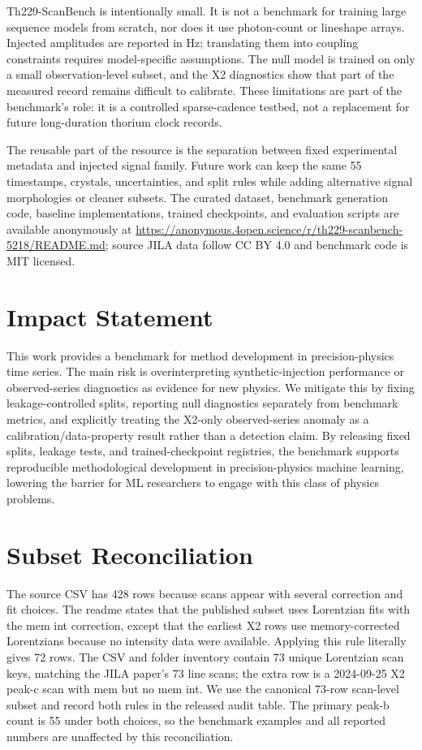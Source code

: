 \documentclass{article}
\newcommand{\thscan}{Th229-ScanBench}
\newcommand{\anonrepo}{\url{https://anonymous.4open.science/r/th229-scanbench-5218/README.md}}
\begin{document}
\thscan{} is intentionally small.  It is not a benchmark for training large sequence models from scratch, nor does it use photon-count or lineshape arrays.  Injected amplitudes are reported in Hz; translating them into coupling constraints requires model-specific assumptions.  The null model is trained on only a small observation-level subset, and the X2 diagnostics show that part of the measured record remains difficult to calibrate.  These limitations are part of the benchmark's role: it is a controlled sparse-cadence testbed, not a replacement for future long-duration thorium clock records.

The reusable part of the resource is the separation between fixed experimental metadata and injected signal family.  Future work can keep the same 55 timestamps, crystals, uncertainties, and split rules while adding alternative signal morphologies or cleaner subsets.  The curated dataset, benchmark generation code, baseline implementations, trained checkpoints, and evaluation scripts are available anonymously at \anonrepo{}; source JILA data follow CC BY 4.0 and benchmark code is MIT licensed.

\section*{Impact Statement}

This work provides a benchmark for method development in precision-physics time series.  The main risk is overinterpreting synthetic-injection performance or observed-series diagnostics as evidence for new physics.  We mitigate this by fixing leakage-controlled splits, reporting null diagnostics separately from benchmark metrics, and explicitly treating the X2-only observed-series anomaly as a calibration/data-property result rather than a detection claim.  By releasing fixed splits, leakage tests, and trained-checkpoint registries, the benchmark supports reproducible methodological development in precision-physics machine learning, lowering the barrier for ML researchers to engage with this class of physics problems.




\appendix

\section{Subset Reconciliation}\label{app:subset}

The source CSV has 428 rows because scans appear with several correction and fit choices.  The readme states that the published subset uses Lorentzian fits with the mem int correction, except that the earliest X2 rows use memory-corrected Lorentzians because no intensity data were available.  Applying this rule literally gives 72 rows.  The CSV and folder inventory contain 73 unique Lorentzian scan keys, matching the JILA paper's 73 line scans; the extra row is a 2024-09-25 X2 peak-c scan with mem but no mem int.  We use the canonical 73-row scan-level subset and record both rules in the released audit table.  The primary peak-b count is 55 under both choices, so the benchmark examples and all reported numbers are unaffected by this reconciliation.
\end{document}
